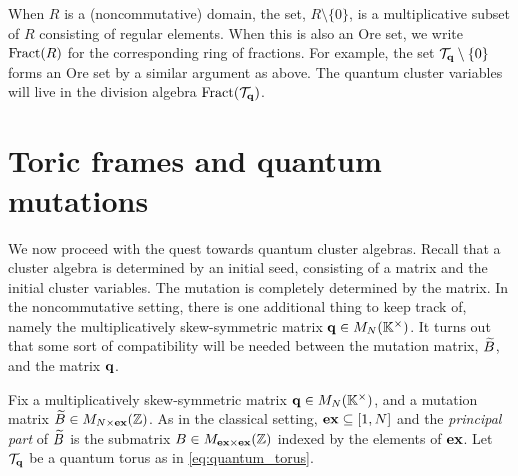 When $R$ is a (noncommutative) domain, the set, $R \setminus \{0\}$, is a
multiplicative subset of $R$ consisting of regular elements. When this is also an Ore
set, we write $\operatorname{Fract}(R)$ for the corresponding ring of
fractions. For example, the set $\mathcal{T}_{\mathbf{q}} \setminus \{0\}$ forms an Ore set by a
similar argument as above. The quantum cluster variables will live in the division
algebra $\operatorname{Fract}(\mathcal{T}_{\mathbf{q}})$.

\section{Toric frames and quantum mutations}

We now proceed with the quest towards quantum cluster algebras. Recall that a cluster
algebra is determined by an initial seed, consisting of a matrix and the initial
cluster variables. The mutation is completely determined by the matrix. In the
noncommutative setting, there is one additional thing to keep track of, namely the
multiplicatively skew-symmetric matrix $\mathbf{q} \in M_N(\mathbb{K}^\times)$. It turns out that
some sort of compatibility will be needed between the mutation matrix, $\widetilde{B}$, and the
matrix $\mathbf{q}$.

Fix a multiplicatively skew-symmetric matrix $\mathbf{q} \in M_N (\mathbb{K}^\times)$, and a
mutation matrix $\widetilde{B} \in M_{N \times \mathbf{ex}}(\mathbb{Z})$. As in the classical setting, $\mathbf{ex}
	\subseteq [1, N]$ and the \emph{principal part} of $\widetilde{B}$ is the
submatrix $B \in M_{\mathbf{ex} \times \mathbf{ex}}(\mathbb{Z})$ indexed by the elements of $\mathbf{ex}$. Let
$\mathcal{T}_{\mathbf{q}}$ be a quantum torus as in \cref{eq:quantum_torus}.

